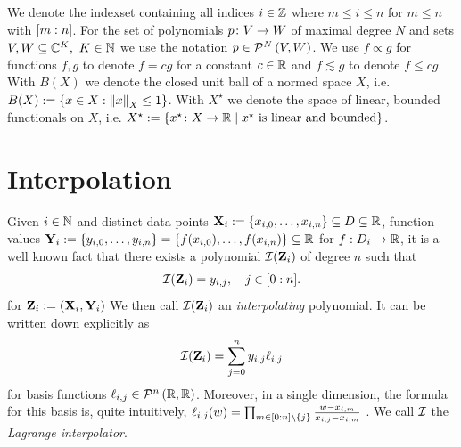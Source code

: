\documentclass[12pt, oneside]{amsart}
\theoremstyle{definition}
\theoremstyle{remark}
\numberwithin{equation}{section}
\begin{document}

We denote the indexset containing all indices $i\in \Z$ 
where $m\leq i\leq n$ for $m\leq n$ with \(\indexset[m]{n}\). For the set of 
polynomials \(p \from V \to W\) of maximal 
degree \(N\) and sets \(V, W \subseteq \C^K,\ K \in \N\) we use the notation 
\(p \in \pols[N]{V, W}\). 
We use \(f \propto g\) for functions \(f, g\) to denote \(f = 
c g\) for a constant \(c \in \R\) and \(f \lesssim g\) to denote \(f \leq c 
g\). With \(B(X)\) we denote the closed unit ball of a normed space \(X\), 
i.e.\ \(B(X) \defn \set{x \in X: \norm[X]{x} \leq 1}\). With \(X^\star\) we 
denote the space of linear, bounded functionals on \(X\), i.e. \(X^\star \defn 
\set{x^\star\from X \to \R \mid x^\star \text{ is linear and bounded}}\).
\newpage
\section{Interpolation}

Given \(i \in \N\) and distinct data points \(\XX_i \defn \set{x_{i, 0}, \dots, x_{i, n}} \subseteq D \subseteq \R\), function values \(\YY_i \defn \set{y_{i, 0}, \dots, y_{i, n}} = \set{f(x_{i, 0}), \dots, f(x_{i, n})} \subseteq \R\) for \(f: D_i \to \R\), it is a well known fact that there exists a polynomial \(\cI(\ZZ_i)\) of degree \(n\) such that \[
    \cI(\ZZ_i) = y_{i, j},\quad j \in \indexset[0]{n}.
\]
for \(\ZZ_i \defn (\XX_i, \YY_i)\)
We then call \(\cI(\ZZ_i)\) an \emph{interpolating} polynomial. It can be written down explicitly as \begin{equation}\label{interpolating_polynomial}
    \cI(\ZZ_i) = \sum_{j=0}^n y_{i, j} \ell_{i, j}
\end{equation}
for basis functions \(\ell_{i, j} \in \pols[n]{\R, \R}\). Moreover, in a single dimension, the formula for this basis is, quite intuitively, \(\ell_{i, j}(w) = \prod_{m \in \indexset[0]{n} \setminus \set{j}} \frac{w-x_{i, m}}{x_{i, j}-x_{i, m}}\) \cite{waring1779, lagrange1901}. We call \(\cI\) the \emph{Lagrange interpolator}.
\end{document}
